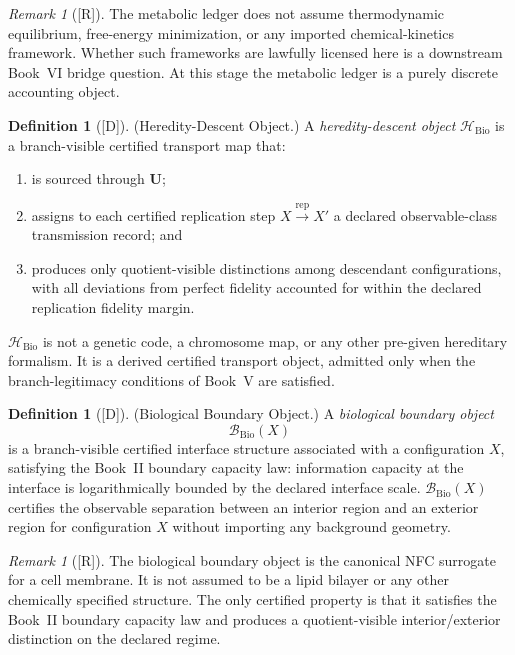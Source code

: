 \documentclass[12pt,oneside]{amsbook}
\theoremstyle{plain}
\theoremstyle{definition}
\newtheorem{definition}[theorem]{Definition}
\theoremstyle{remark}
\newtheorem{remark}[theorem]{Remark}
\newcommand{\status}[1]{\textup{[#1]}}
\begin{document}
\begin{remark}[\status{R}]\label{rem:bio-metabolism-remark}
The metabolic ledger does not assume thermodynamic equilibrium,
free-energy minimization, or any imported chemical-kinetics framework.
Whether such frameworks are lawfully licensed here is a downstream
Book~VI bridge question. At this stage the metabolic ledger is
a purely discrete accounting object.
\end{remark}

\begin{definition}[\status{D}]\label{def:bio-heredity-descent}
\textup{(Heredity-Descent Object.)}
A \emph{heredity-descent object} $\mathcal{H}_{\mathrm{Bio}}$ is a
branch-visible certified transport map that:
\begin{enumerate}[label=\textup{(\arabic*)}]
 \item is sourced through $\mathbf{U}$;
 \item assigns to each certified replication step
 $X \xrightarrow{\mathrm{rep}} X'$ a declared
 observable-class transmission record; and
 \item produces only quotient-visible distinctions among descendant
 configurations, with all deviations from perfect fidelity accounted
 for within the declared replication fidelity margin.
\end{enumerate}
$\mathcal{H}_{\mathrm{Bio}}$ is not a genetic code, a chromosome map,
or any other pre-given hereditary formalism. It is a derived certified
transport object, admitted only when the branch-legitimacy conditions
of Book~V are satisfied.
\end{definition}

\begin{definition}[\status{D}]\label{def:bio-boundary-object}
\textup{(Biological Boundary Object.)}
A \emph{biological boundary object}
\[
 \mathcal{B}_{\mathrm{Bio}}(X)
\]
is a branch-visible certified interface structure associated with a
configuration $X$, satisfying the Book~II boundary capacity law:
information capacity at the interface is logarithmically bounded by
the declared interface scale. $\mathcal{B}_{\mathrm{Bio}}(X)$
certifies the observable separation between an interior region and an
exterior region for configuration $X$ without importing any background
geometry.
\end{definition}

\begin{remark}[\status{R}]\label{rem:bio-membrane-remark}
The biological boundary object is the canonical NFC surrogate for a
cell membrane. It is not assumed to be a lipid bilayer or any other
chemically specified structure. The only certified property is that
it satisfies the Book~II boundary capacity law and produces a
quotient-visible interior/exterior distinction on the declared regime.
\end{remark}
\end{document}
